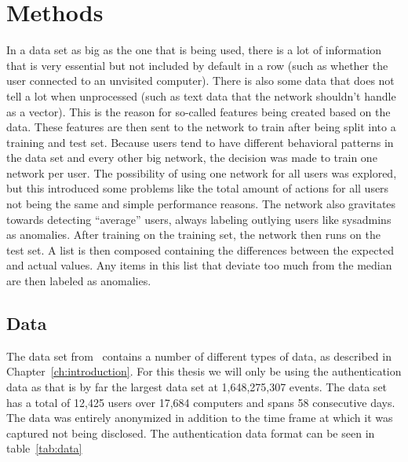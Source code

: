 \chapter{Methods}\label{ch:methods}

In a data set as big as the one that is being used, there is a lot of information that is very essential but not included by default in a row (such as whether the user connected to an unvisited computer). There is also some data that does not tell a lot when unprocessed (such as text data that the network shouldn't handle as a vector). This is the reason for so-called features being created based on the data. These features are then sent to the network to train after being split into a training and test set. Because users tend to have different behavioral patterns in the data set and every other big network, the decision was made to train one network per user. The possibility of using one network for all users was explored, but this introduced some problems like the total amount of actions for all users not being the same and simple performance reasons. The network also gravitates towards detecting \enquote{average} users, always labeling outlying users like sysadmins as anomalies. After training on the training set, the network then runs on the test set. A list is then composed containing the differences between the expected and actual values. Any items in this list that deviate too much from the median are then labeled as anomalies.

\section{Data}
The data set from~\cite{akent-2015-enterprise-data} contains a number of different types of data, as described in Chapter~\ref{ch:introduction}. For this thesis we will only be using the authentication data as that is by far the largest data set at 1,648,275,307 events. The data set has a total of 12,425 users over 17,684 computers and spans 58 consecutive days. The data was entirely anonymized in addition to the time frame at which it was captured not being disclosed. The authentication data format can be seen in table~\ref{tab:data}


